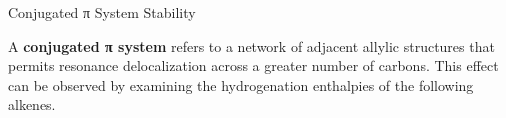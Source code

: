     \begin{core}{Conjugated π System Stability}

      A \textbf{conjugated π system} refers to a network of adjacent allylic structures that permits resonance delocalization across a greater number of carbons. This effect can be observed by examining the hydrogenation enthalpies of the following alkenes.

      \begin{figure}[H]
        \centering

        \begin{minipage}{\textwidth}
          \centering
        \end{minipage}

        \vspace{2.5em}

        \begin{minipage}{\textwidth}
          \centering
        \end{minipage}

        \vspace{2.5em}

        \begin{minipage}{\textwidth}
          \centering
        \end{minipage}


\end{figure}
\end{core}
